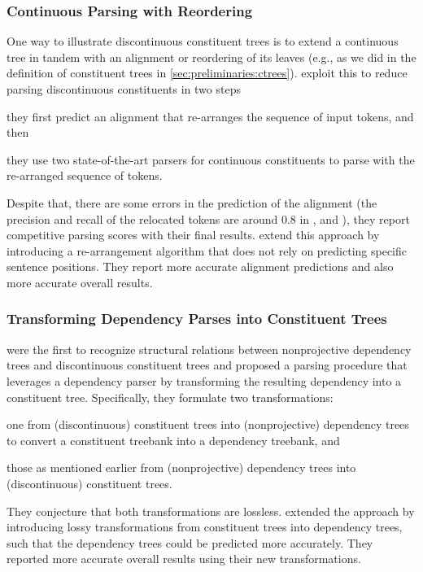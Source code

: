 \documentclass[../document.tex]{subfiles}
\begin{document}
    \subsubsection*{Continuous Parsing with Reordering}
    One way to illustrate discontinuous constituent trees is to extend a continuous tree in tandem with an alignment or reordering of its leaves (e.g.\@, as we did in the definition of constituent trees in \cref{sec:preliminaries:ctrees}).
     exploit this to reduce parsing discontinuous constituents in two steps
    \begin{inparaenum}[]
        \item they first predict an alignment that re-arranges the sequence of input tokens, and then
        \item they use two state-of-the-art parsers for continuous constituents to parse with the re-arranged sequence of tokens.
    \end{inparaenum}
    Despite that, there are some errors in the prediction of the alignment (the precision and recall of the relocated tokens are around $0.8$ in \dptb{}, \negra{} and \tiger{}), they report competitive parsing scores with their final results.
     extend this approach by introducing a re-arrangement algorithm that does not rely on predicting specific sentence positions.
    They report more accurate alignment predictions and also more accurate overall results.

    \subsubsection*{Transforming Dependency Parses into Constituent Trees}
     were the first to recognize structural relations between nonprojective dependency trees and discontinuous constituent trees and proposed a parsing procedure that leverages a dependency parser by transforming the resulting dependency into a constituent tree.
    Specifically, they formulate two transformations:
    \begin{inparaenum}[]
        \item one from (discontinuous) constituent trees into (nonprojective) dependency trees to convert a constituent treebank into a dependency treebank, and
        \item those as mentioned earlier from (nonprojective) dependency trees into (discontinuous) constituent trees.
    \end{inparaenum}
    They conjecture that both transformations are lossless.
     extended the approach by introducing lossy transformations from constituent trees into dependency trees, such that the dependency trees could be predicted more accurately.
    They reported more accurate overall results using their new transformations.
\end{document}
